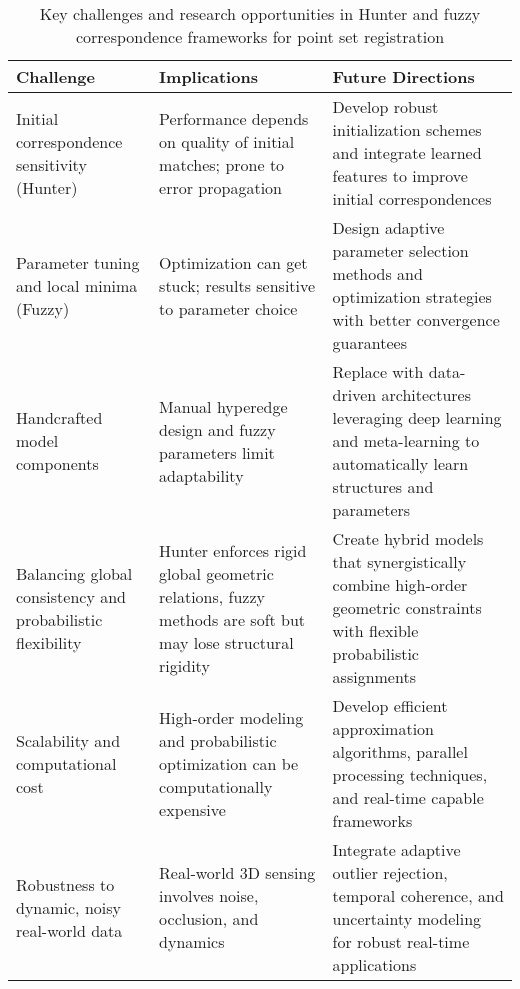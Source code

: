 \documentclass[sigconf]{acmart}
\begin{document}
\begin{table*}[htbp]
\centering
\caption{Key challenges and research opportunities in Hunter and fuzzy correspondence frameworks for point set registration}
\label{tab:challenges_future}
\begin{adjustbox}{max width=\textwidth}
\begin{tabular}{@{}lll@{}}
\toprule
\textbf{Challenge} & \textbf{Implications} & \textbf{Future Directions} \\
\midrule
Initial correspondence sensitivity (Hunter) & Performance depends on quality of initial matches; prone to error propagation & Develop robust initialization schemes and integrate learned features to improve initial correspondences \\

Parameter tuning and local minima (Fuzzy) & Optimization can get stuck; results sensitive to parameter choice & Design adaptive parameter selection methods and optimization strategies with better convergence guarantees \\

Handcrafted model components & Manual hyperedge design and fuzzy parameters limit adaptability & Replace with data-driven architectures leveraging deep learning and meta-learning to automatically learn structures and parameters \\

Balancing global consistency and probabilistic flexibility & Hunter enforces rigid global geometric relations, fuzzy methods are soft but may lose structural rigidity & Create hybrid models that synergistically combine high-order geometric constraints with flexible probabilistic assignments \\

Scalability and computational cost & High-order modeling and probabilistic optimization can be computationally expensive & Develop efficient approximation algorithms, parallel processing techniques, and real-time capable frameworks \\

Robustness to dynamic, noisy real-world data & Real-world 3D sensing involves noise, occlusion, and dynamics & Integrate adaptive outlier rejection, temporal coherence, and uncertainty modeling for robust real-time applications \\

\bottomrule
\end{tabular}
\end{adjustbox}
\end{table*}
\end{document}
